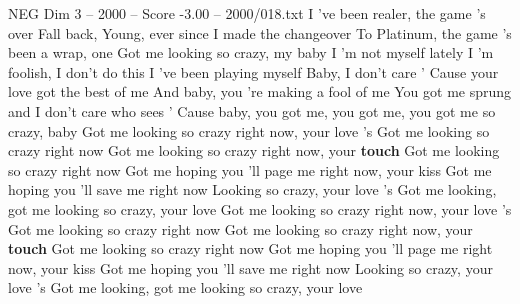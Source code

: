 \begin{textsample}{NEG Dim 3 – 2000 – Score -3.00 – 2000/018.txt}
I 've been realer, the game 's over Fall back, Young, ever since I made the changeover To Platinum, the game 's been a wrap, one Got me looking so crazy, my baby I 'm not myself lately I 'm foolish, I don't do this I 've been playing myself Baby, I don't care ' Cause your love got the best of me And baby, you 're making a fool of me You got me sprung and I don't care who sees ' Cause baby, you got me, you got me, you got me so crazy, baby Got me looking so crazy right now, your love 's Got me looking so crazy right now Got me looking so crazy right now, your \textbf{touch} Got me looking so crazy right now Got me hoping you 'll page me right now, your kiss Got me hoping you 'll save me right now Looking so crazy, your love 's Got me looking, got me looking so crazy, your love Got me looking so crazy right now, your love 's Got me looking so crazy right now Got me looking so crazy right now, your \textbf{touch} Got me looking so crazy right now Got me hoping you 'll page me right now, your kiss Got me hoping you 'll save me right now Looking so crazy, your love 's Got me looking, got me looking so crazy, your love

\end{textsample}
